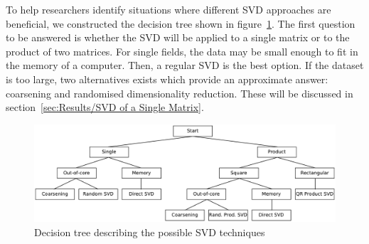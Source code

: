 \documentclass[ijgi,article,submit,moreauthors,pdftex,10pt,a4paper]{Definitions/mdpi}
\begin{document}
%
%


To help researchers identify situations where different SVD approaches are beneficial, we constructed the decision tree shown in figure~\ref{fig:FlowDiagram}. The first question to be answered is whether the SVD will be applied to a single matrix or to the product of two matrices. For single fields, the data may be small enough to fit in the memory of a computer. Then, a regular SVD is the best option. If the dataset is too large, two alternatives exists which provide an approximate answer: coarsening and randomised dimensionality reduction. These will be discussed in section~\ref{sec:Results/SVD of a Single Matrix}.

\begin{figure}[H]
\centering
\includegraphics[width=\textwidth]{Results/FlowDiagram.pdf}
\caption{Decision tree describing the possible SVD techniques}
\label{fig:FlowDiagram}
\end{figure}
\end{document}
